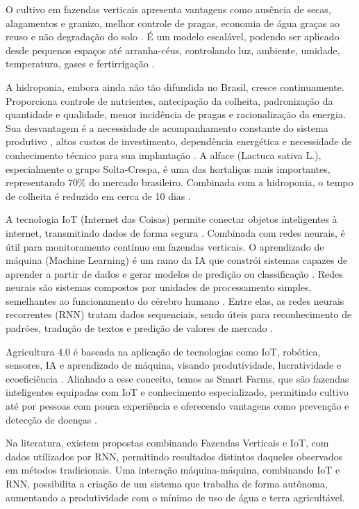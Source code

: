 O cultivo em fazendas verticais apresenta vantagens como ausência de secas, alagamentos e granizo, melhor controle de pragas, economia de água graças ao reuso e não degradação do solo \cite{ingram2023}. É um modelo escalável, podendo ser aplicado desde pequenos espaços até arranha-céus, controlando luz, ambiente, umidade, temperatura, gases e fertirrigação \cite{lucena2021}.

A hidroponia, embora ainda não tão difundida no Brasil, cresce continuamente. Proporciona controle de nutrientes, antecipação da colheita, padronização da quantidade e qualidade, menor incidência de pragas e racionalização da energia. Sua desvantagem é a necessidade de acompanhamento constante do sistema produtivo \cite{luz2006}, altos custos de investimento, dependência energética e necessidade de conhecimento técnico para sua implantação \cite{alves2021}. A alface (Lactuca sativa L.), especialmente o grupo Solta-Crespa, é uma das hortaliças mais importantes, representando 70\% do mercado brasileiro. Combinada com a hidroponia, o tempo de colheita é reduzido em cerca de 10 dias \cite{luz2006}.

A tecnologia IoT (Internet das Coisas) permite conectar objetos inteligentes à internet, transmitindo dados de forma segura \cite{carnaz2016}. Combinada com redes neurais, é útil para monitoramento contínuo em fazendas verticais. O aprendizado de máquina (Machine Learning) é um ramo da IA que constrói sistemas capazes de aprender a partir de dados e gerar modelos de predição ou classificação \cite{paixao2022}. Redes neurais são sistemas compostos por unidades de processamento simples, semelhantes ao funcionamento do cérebro humano \cite{haykin2001}. Entre elas, as redes neurais recorrentes (RNN) tratam dados sequenciais, sendo úteis para reconhecimento de padrões, tradução de textos e predição de valores de mercado \cite{baronte2022}.

Agricultura 4.0 é baseada na aplicação de tecnologias como IoT, robótica, sensores, IA e aprendizado de máquina, visando produtividade, lucratividade e ecoeficiência \cite{lisbinski2020}. Alinhado a esse conceito, temos as Smart Farms, que são fazendas inteligentes equipadas com IoT e conhecimento especializado, permitindo cultivo até por pessoas com pouca experiência e oferecendo vantagens como prevenção e detecção de doenças \cite{ryu2015}.

Na literatura, existem propostas combinando Fazendas Verticais e IoT, com dados utilizados por RNN, permitindo resultados distintos daqueles observados em métodos tradicionais. Uma interação máquina-máquina, combinando IoT e RNN, possibilita a criação de um sistema que trabalha de forma autônoma, aumentando a produtividade com o mínimo de uso de água e terra agricultável.
